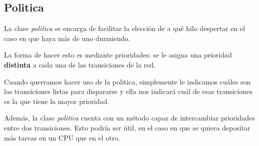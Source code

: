 \documentclass{article}
\begin{document}
    \subsection{Politica}
    La clase \emph{politica} se encarga de facilitar la elección de a qué hilo despertar en 
    el caso en que haya más de uno durmiendo. \par
    La forma de hacer esto es mediante prioridades: se le asigna una prioridad \textbf{distinta}
    a cada una de las transiciones de la red. \par
    Cuando querramos hacer uso de la politica, simplemente le indicamos cuáles son las
    transiciones listas para dispararse y ella nos indicará cuál de esas transiciones es la
    que tiene la mayor prioridad. \par
    Además, la clase \emph{politica} cuenta con un método capaz de intercambiar prioridades
    entre dos transiciones. Esto podría ser útil, en el caso en que se quiera depositar más
    tareas en un CPU que en el otro.
\end{document}
